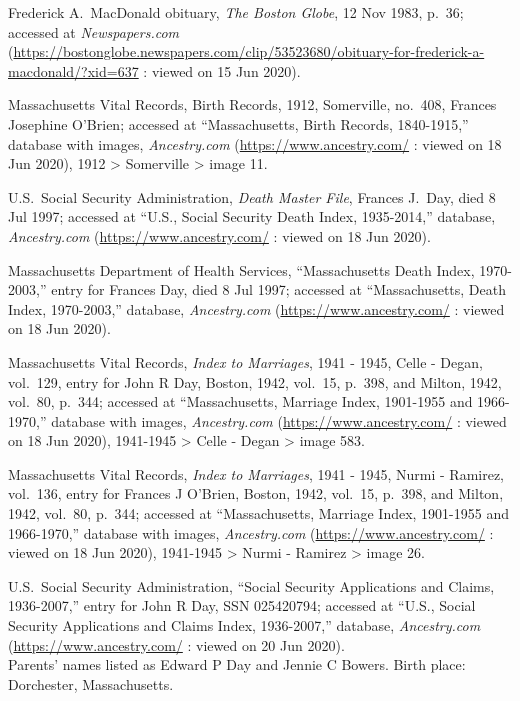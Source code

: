 \begin{thebibliography}{999}
	Frederick A.\ MacDonald obituary, \textit{The Boston Globe}, 12 Nov 1983, p.\ 36; accessed at \textit{Newspapers.com} (\url{https://bostonglobe.newspapers.com/clip/53523680/obituary-for-frederick-a-macdonald/?xid=637} : viewed on 15 Jun 2020).
	
	Massachusetts Vital Records, Birth Records, 1912, Somerville, no.\ 408, Frances Josephine O'Brien; accessed at ``Massachusetts, Birth Records, 1840-1915,'' database with images, \textit{Ancestry.com} (\url{https://www.ancestry.com/} : viewed on 18 Jun 2020), 1912 > Somerville > image 11.
	
	U.S.\ Social Security Administration, \textit{Death Master File}, Frances J.\ Day, died 8 Jul 1997; accessed at ``U.S., Social Security Death Index, 1935-2014,'' database, \textit{Ancestry.com} (\url{https://www.ancestry.com/} : viewed on 18 Jun 2020).
	
	Massachusetts Department of Health Services, ``Massachusetts Death Index, 1970-2003,'' entry for Frances Day, died 8 Jul 1997; accessed at ``Massachusetts, Death Index, 1970-2003,'' database, \textit{Ancestry.com} (\url{https://www.ancestry.com/} : viewed on 18 Jun 2020).
	
	Massachusetts Vital Records, \textit{Index to Marriages}, 1941 - 1945, Celle - Degan, vol.\ 129, entry for John R Day, Boston, 1942, vol.\ 15, p.\ 398, and Milton, 1942, vol.\ 80, p.\ 344; accessed at ``Massachusetts, Marriage Index, 1901-1955 and 1966-1970,'' database with images, \textit{Ancestry.com} (\url{https://www.ancestry.com/} : viewed on 18 Jun 2020), 1941-1945 > Celle - Degan > image 583.
	
	Massachusetts Vital Records, \textit{Index to Marriages}, 1941 - 1945, Nurmi - Ramirez, vol.\ 136, entry for Frances J O'Brien, Boston, 1942, vol.\ 15, p.\ 398, and Milton, 1942, vol.\ 80, p.\ 344;  accessed at ``Massachusetts, Marriage Index, 1901-1955 and 1966-1970,'' database with images, \textit{Ancestry.com} (\url{https://www.ancestry.com/} : viewed on 18 Jun 2020), 1941-1945 > Nurmi - Ramirez > image 26.
	
	U.S.\ Social Security Administration, ``Social Security Applications and Claims, 1936-2007,'' entry for John R Day, SSN 025420794; accessed at ``U.S., Social Security Applications and Claims Index, 1936-2007,'' database, \textit{Ancestry.com} (\url{https://www.ancestry.com/} : viewed on 20 Jun 2020).\\
	Parents' names listed as Edward P Day and Jennie C Bowers. Birth place: Dorchester, Massachusetts.
	

\end{thebibliography}
